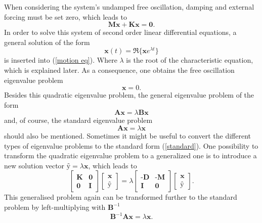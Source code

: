 \documentclass[conference]{journal}
\begin{document}
	When considering the system's undamped free oscillation, damping and external forcing must be set zero, which leads to
	\begin{equation}
	\textbf{M\"x}+\textbf{Kx}=\textbf{0}.
	\end{equation}
	In order to solve this system of second order linear differential equations, a general solution of the form
	\begin{equation}
	\textbf{x}(t)=\Re\{\textbf{\^x}e^{\lambda t}\}
	\end{equation}
	is inserted into (\ref{motion eq}). Where $\lambda$ is the root of the characteristic equation, which is explained later. As a consequence, one obtains the free oscillation eigenvalue problem
	\begin{equation}
	[\textbf{K}+\lambda^2 \textbf{M}]\textbf{\^x}=0.
	\end{equation}
	Besides this quadratic eigenvalue problem, the general eigenvalue problem of the form
	\begin{equation}
	\textbf{A\^x}=\lambda\textbf{B\^x}
	\end{equation}
	and, of course, the standard eigenvalue problem
	\begin{equation}\label{standard}
	\textbf{A\^x}=\lambda\textbf{\^x}
	\end{equation}
	should also be mentioned. Sometimes it might be useful to convert the different types of eigenvalue problems to the standard form (\ref{standard}). One possibility to transform the quadratic eigenvalue problem to a generalized one is to introduce a new solution vector $\textbf{\^y}=\lambda\textbf{\^x}$, which leads to
	\begin{equation}
	\begin{bmatrix}
	\textbf{K} & \textbf{0} \\
	\textbf{0} & \textbf{I}
	\end{bmatrix}
	\begin{bmatrix}
	\textbf{\^x} \\
	\textbf{\^y}
	\end{bmatrix}
	=\lambda
	\begin{bmatrix}
	\textbf{-D} & \textbf{-M} \\
	\textbf{I} & \textbf{0}
	\end{bmatrix}
	\begin{bmatrix}
	\textbf{\^x} \\
	\textbf{\^y}
	\end{bmatrix}.
	\end{equation}
	This generalised problem again can be transformed further to the standard problem by left-multiplying with $\textbf{B}^{-1}$
	\begin{equation}
	\textbf{B}^{-1}\textbf{A\^x}=\lambda\textbf{\^x}.
	\end{equation}
	
\end{document}
